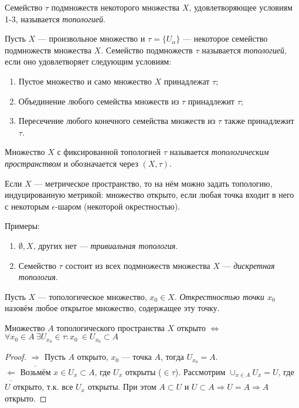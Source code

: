 \begin{definition}
    Семейство $\tau$ подмножеств некоторого множества $X$, удовлетворяющее условиям 1-3, называется \textit{топологией}.
\end{definition}

\begin{definition}
    Пусть $X$ — произвольное множество и $\tau = \{U_{\alpha}\}$ — некоторое семейство подмножеств множества $X$. Семейство подмножеств $\tau$ называется \textit{топологией}, если оно удовлетворяет следующим условиям:
    \begin{enumerate}
        \item Пустое множество и само множество $X$ принадлежат $\tau$;
        \item Объединение любого семейства множеств из $\tau$ принадлежит $\tau$;
        \item Пересечение любого конечного семейства множеств из $\tau$ также принадлежит $\tau$.
    \end{enumerate}
\end{definition}

\begin{definition}
    Множество $X$ с фиксированной топологией $\tau$ называется \textit{топологическим пространством} и обозначается через $(X, \tau)$.
\end{definition}

Если $X$ — метрическое пространство, то на нём можно задать топологию, индуцированную метрикой: множество открыто, если любая точка входит в него с некоторым $\epsilon$-шаром (некоторой окрестностью).

Примеры:
\begin{enumerate}
    \item $\emptyset, X$, других нет — \textit{тривиальная топология}.
    \item Семейство $\tau$ состоит из всех подмножеств множества $X$ — \textit{дискретная топология}.
\end{enumerate}

\begin{definition}
    Пусть $X$ — топологическое множество, $x_0 \in X$. \textit{Открестностью точки $x_0$} назовём любое открытое множество, содержащее эту точку.
\end{definition}

\begin{statement}
    Множество $A$ топологического пространства $X$ открыто $\Leftrightarrow$ $\forall x_0 \in A \ \exists U_{x_0} \in \tau: x_0 \ \in U_{x_0} \subset A$
\end{statement}
\begin{proof}
    $\underline{\Longrightarrow}$ Пусть $A$ открыто, $x_0$ — точка $A$, тогда $U_{x_0} = A$. \\
    $\underline{\Longleftarrow}$ Возьмём $x \in U_x \subset A$, где $U_x$ открыты ($\in \tau$).
    Рассмотрим $\cup_{x \in A} U_x = U$, где $U$ открыто, т.к. все $U_x$ открыты.
    При этом $A \subset U$ и $U \subset A \Rightarrow U = A \Rightarrow A$ открыто.
\end{proof}

